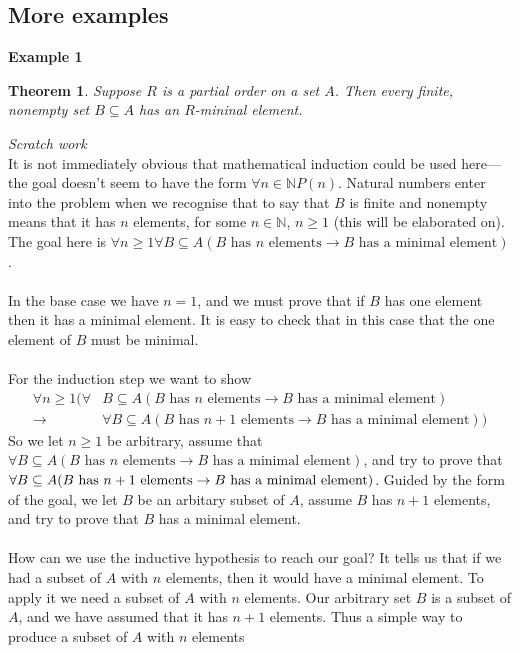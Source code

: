 \documentclass{report}
\newtheorem*{theorem}{Theorem}
\theoremstyle{definition}
\begin{document}
\subsection{More examples}
\textbf{Example 1}
\begin{theorem}
Suppose $R$ is a partial order on a set $A$. Then every finite, nonempty set $B\subseteq A$ has an $R$-mininal element.
\end{theorem}
\noindent\textit{Scratch work}\\
It is not immediately obvious that mathematical induction could be used here---the goal doesn't seem to have the form $\forall n\in\mathbb N P(n)$. Natural numbers
enter into the problem when we recognise that to say that $B$ is finite and nonempty means that it has $n$ elements, for some $n\in\mathbb N$, $n\geq 1$ (this will be elaborated on).
The goal here is $\forall n\geq1\forall B\subseteq A(B\text{ has $n$ elements}\to B\text{ has a minimal element})$.\\
\vspace{1mm}\\
In the base case we have $n=1$, and we must prove that if $B$ has one element then it has a minimal element. It is easy to check that in this case that the one element of $B$ must be minimal.\\
\vspace{1mm}\\
For the induction step we want to show 
\begin{align*}
\forall n\geq1(\forall&B\subseteq A(B\text{ has $n$ elements}\to B\text{ has a minimal element})\\\to
&\forall B\subseteq A(B\text{ has $n+1$ elements}\to B\text{ has a minimal element}))
\end{align*}
So we let $n\geq1$ be arbitrary, assume that
$\forall B\subseteq A(B\text{ has $n$ elements}\to B\text{ has a minimal element})$, and try to prove that $\forall B\subseteq A(B\text{ has $n+1$ elements}\\\to B\text{ has a minimal element})$.
Guided by the form of the goal, we let $B$ be an arbitary subset of $A$, assume $B$ has $n+1$ elements, and try to prove that $B$ has a minimal element.\\
\vspace{1mm}\\
How can we use the inductive hypothesis to reach our goal? It tells us that if we had a subset of $A$ with $n$ elements, then it would have a minimal element. To apply it 
we need a subset of $A$ with $n$ elements. Our arbitrary set $B$ is a subset of $A$, and we have assumed that it has $n+1$ elements. Thus a simple way to produce a subset of $A$ with $n$ elements 
\end{document}
